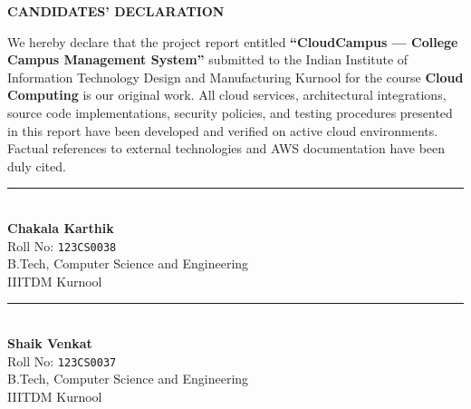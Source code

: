 \vspace{1.0cm}
\begin{center}
{\LARGE \bfseries \color{primaryblue} CANDIDATES' DECLARATION}\\[0.3cm]
\end{center}

\noindent We hereby declare that the project report entitled \textbf{``CloudCampus --- College Campus Management System''} submitted to the Indian Institute of Information Technology Design and Manufacturing Kurnool for the course \textbf{Cloud Computing} is our original work. All cloud services, architectural integrations, source code implementations, security policies, and testing procedures presented in this report have been developed and verified on active cloud environments. Factual references to external technologies and AWS documentation have been duly cited.

\vspace{1.5cm}

\begin{minipage}[t]{0.48\textwidth}
\begin{center}
\rule{5.0cm}{0.8pt}\\[0.15cm]
\textbf{Chakala Karthik}\\
Roll No: \texttt{123CS0038}\\
B.Tech, Computer Science and Engineering\\
IIITDM Kurnool
\end{center}
\end{minipage}
\hfill
\begin{minipage}[t]{0.48\textwidth}
\begin{center}
\rule{5.0cm}{0.8pt}\\[0.15cm]
\textbf{Shaik Venkat}\\
Roll No: \texttt{123CS0037}\\
B.Tech, Computer Science and Engineering\\
IIITDM Kurnool
\end{center}
\end{minipage}
